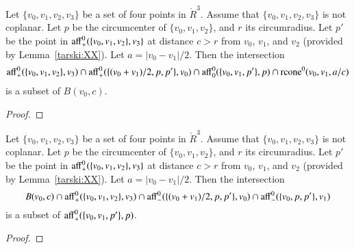 \begin{tarskidata}
\begin{tarski}

\begin{lemma}
Let $\{v_0,v_1,v_2,v_3\}$ be a set of four points in $\ring{R}^3$.
Assume that $\{v_0,v_1,v_2,v_3\}$ is not coplanar.  Let $p$
be the circumcenter of $\{v_0,v_1,v_2\}$, and $r$ its circumradius.  
Let $p'$ be the
point in ${\operatorname{aff}}_+^0(\{v_0,v_1,v_2\},v_3\}$ at distance
$c > r$ from $v_0$, $v_1$, and $v_2$ (provided by Lemma~\ref{tarski:XX}).
Let $a = |v_0-v_1|/2$.
Then the intersection
  $$
  {\operatorname{aff}}^0_+(\{v_0,v_1,v_2\},v_3) \cap
  {\operatorname{aff}}^0_+(\{(v_0+v_1)/2,p,p' \},v_0) \cap
  {\operatorname{aff}}^0_0(\{v_0,v_1,p'\},p)\cap
  {\operatorname{rcone}}^0(v_0,v_1,a/c)
  $$
is a subset of $B(v_0,c)$.
\end{lemma}

\begin{proof}
\end{proof}
\end{tarski}






\begin{tarski}

\begin{lemma}
Let $\{v_0,v_1,v_2,v_3\}$ be a set of four points in $\ring{R}^3$.
Assume that $\{v_0,v_1,v_2,v_3\}$ is not coplanar.  Let $p$
be the circumcenter of $\{v_0,v_1,v_2\}$, and $r$ its circumradius.  
Let $p'$ be the
point in ${\operatorname{aff}}_+^0(\{v_0,v_1,v_2\},v_3\}$ at distance
$c > r$ from $v_0$, $v_1$, and $v_2$ (provided by Lemma~\ref{tarski:XX}).
Let $a = |v_0-v_1|/2$.
Then the intersection
  $$
  B(v_0,c)\cap
  {\operatorname{aff}}^0_+(\{v_0,v_1,v_2\},v_3) \cap
  {\operatorname{aff}}^0_-(\{(v_0+v_1)/2,p,p' \},v_0) \cap
  {\operatorname{aff}}^0_-(\{v_0,p,p'\},v_1)
  $$
is a subset of ${\operatorname{aff}}^0_+(\{v_0,v_1,p'\},p)$.
\end{lemma}

\begin{proof}
\end{proof}
\end{tarski}







\end{tarskidata}
